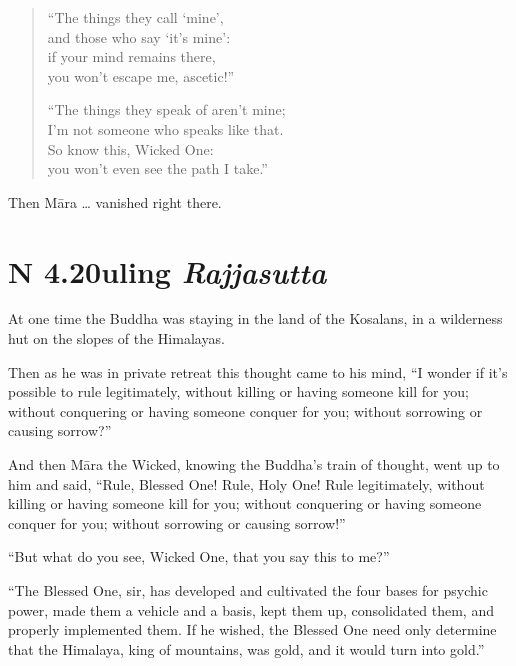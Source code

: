 \documentclass[12pt,openany]{book}%
\newcommand*{\suttatitleacronym}[1]{\smaller[2]{#1}\vspace*{.3em}}
\newcommand*{\suttatitletranslation}[1]{\linebreak{#1}}
\newcommand*{\suttatitleroot}[1]{\linebreak\smaller[2]\itshape{#1}}
\newcommand*{\tocacronym}[1]{\hspace*{-3.3em}{#1}\quad}
\newcommand*{\toctranslation}[1]{#1}
\newcommand*{\tocroot}[1]{(\textit{#1})}
\begin{document}
\begin{verse}%
“The things they call ‘mine’, \\
and those who say ‘it’s mine’: \\
if your mind remains there, \\
you won’t escape me, ascetic!” 

“The things they speak of aren’t mine; \\
I’m not someone who speaks like that. \\
So know this, Wicked One: \\
you won’t even see the path I take.” 

%
\end{verse}

Then \textsanskrit{Māra} … vanished right there. 

%
\section*{{\suttatitleacronym SN 4.20}{\suttatitletranslation Ruling }{\suttatitleroot Rajjasutta}}
\addcontentsline{toc}{section}{\tocacronym{SN 4.20} \toctranslation{Ruling } \tocroot{Rajjasutta}}

At one time the Buddha was staying in the land of the Kosalans, in a wilderness hut on the slopes of the Himalayas. 

Then as he was in private retreat this thought came to his mind, “I wonder if it’s possible to rule legitimately, without killing or having someone kill for you; without conquering or having someone conquer for you; without sorrowing or causing sorrow?” 

And then \textsanskrit{Māra} the Wicked, knowing the Buddha’s train of thought, went up to him and said, “Rule, Blessed One! Rule, Holy One! Rule legitimately, without killing or having someone kill for you; without conquering or having someone conquer for you; without sorrowing or causing sorrow!” 

“But what do you see, Wicked One, that you say this to me?” 

“The Blessed One, sir, has developed and cultivated the four bases for psychic power, made them a vehicle and a basis, kept them up, consolidated them, and properly implemented them. If he wished, the Blessed One need only determine that the Himalaya, king of mountains, was gold, and it would turn into gold.” 
\end{document}
